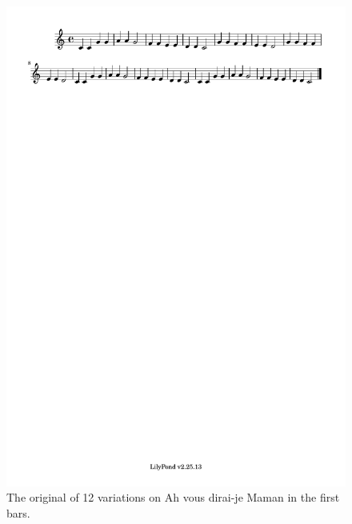\documentclass[11pt]{article}
\theoremstyle{definition}
\begin{document}
\begin{figure}
\centering
\includegraphics[trim=1cm 26.5cm 14.325cm 0.02cm, clip, scale=1]{dabby_1.pdf} %
\caption{The original of 12 variations on Ah vous dirai-je Maman in the first bars.}
\label{fig:MV1} 
\end{figure}
\end{document}
